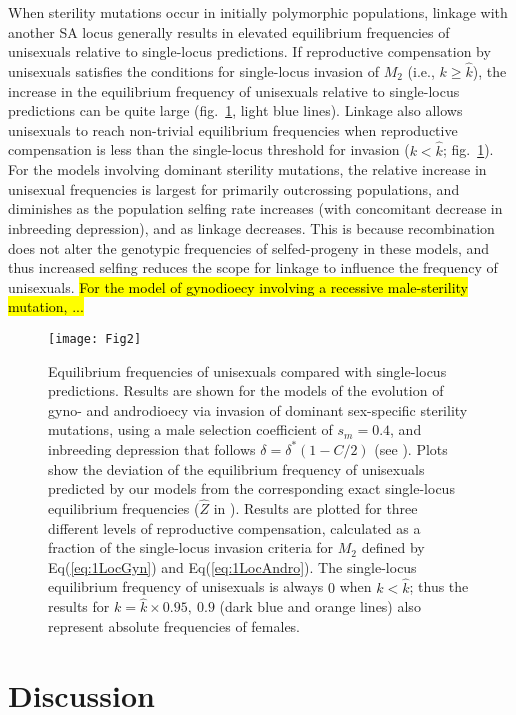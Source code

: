 \documentclass[9pt,twocolumn,twoside,lineno]{gsajnl}
\begin{document}
When sterility mutations occur in initially polymorphic populations, linkage with another SA locus generally results in elevated equilibrium frequencies of unisexuals relative to single-locus predictions. If reproductive compensation by unisexuals satisfies the conditions for single-locus invasion of $M_2$ (i.e., $k \geq \hat{k}$), the increase in the equilibrium frequency of unisexuals relative to single-locus predictions can be quite large (fig.~\ref{fig:eqFreq}, light blue lines). Linkage also allows unisexuals to reach non-trivial equilibrium frequencies when reproductive compensation is less than the single-locus threshold for invasion ($k < \hat{k}$; fig.~\ref{fig:eqFreq}). For the models involving dominant sterility mutations, the relative increase in unisexual frequencies is largest for primarily outcrossing populations, and diminishes as the population selfing rate increases (with concomitant decrease in inbreeding depression), and as linkage decreases. This is because recombination does not alter the genotypic frequencies of selfed-progeny in these models, and thus increased selfing reduces the scope for linkage to influence the frequency of unisexuals. \hl{For the model of gynodioecy involving a recessive male-sterility mutation, ...}




\begin{figure}[htbp]
\centering
\texttt{[image: Fig2]}
\caption{Equilibrium frequencies of unisexuals compared with single-locus predictions. Results are shown for the models of the evolution of gyno- and androdioecy via invasion of dominant sex-specific sterility mutations, using a male selection coefficient of $s_m = 0.4$, and inbreeding depression that follows $\delta = \delta^\ast(1 - C/2)$ (see ). Plots show the deviation of the equilibrium frequency of unisexuals predicted by our models from the corresponding exact single-locus equilibrium frequencies ($\hat{Z}$ in \citealt{Charlesworth1978a}). Results are plotted for three different levels of reproductive compensation, calculated as a fraction of the single-locus invasion criteria for $M_2$ defined by Eq(\ref{eq:1LocGyn}) and Eq(\ref{eq:1LocAndro}). The single-locus equilibrium frequency of unisexuals is always $0$ when $k < \hat{k}$; thus the results for $k = \hat{k} \times 0.95,~0.9$ (dark blue and orange lines) also represent absolute frequencies of females.}
\label{fig:eqFreq}
\end{figure}


\section{Discussion}
\end{document}
